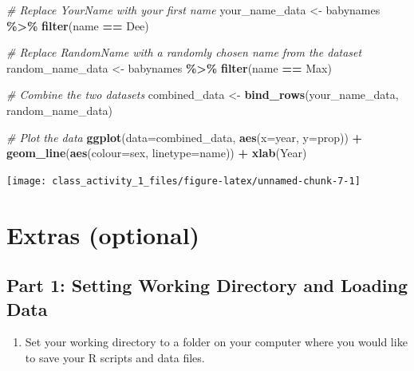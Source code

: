 \documentclass[
]{book}
\newenvironment{Shaded}{\begin{snugshade}}{\end{snugshade}}
\newcommand{\AttributeTok}[1]{\textcolor[rgb]{0.13,0.29,0.53}{#1}}
\newcommand{\CommentTok}[1]{\textcolor[rgb]{0.56,0.35,0.01}{\textit{#1}}}
\newcommand{\FunctionTok}[1]{\textcolor[rgb]{0.13,0.29,0.53}{\textbf{#1}}}
\newcommand{\NormalTok}[1]{#1}
\newcommand{\OtherTok}[1]{\textcolor[rgb]{0.56,0.35,0.01}{#1}}
\newcommand{\SpecialCharTok}[1]{\textcolor[rgb]{0.81,0.36,0.00}{\textbf{#1}}}
\newcommand{\StringTok}[1]{\textcolor[rgb]{0.31,0.60,0.02}{#1}}
\providecommand{\tightlist}{%
  \setlength{\itemsep}{0pt}\setlength{\parskip}{0pt}}
\begin{document}
\begin{Shaded}
\begin{Highlighting}[]
\CommentTok{\# Replace \textquotesingle{}YourName\textquotesingle{} with your first name}
\NormalTok{your\_name\_data }\OtherTok{\textless{}{-}}\NormalTok{ babynames }\SpecialCharTok{\%\textgreater{}\%} \FunctionTok{filter}\NormalTok{(name }\SpecialCharTok{==} \StringTok{\textquotesingle{}Dee\textquotesingle{}}\NormalTok{)}

\CommentTok{\# Replace \textquotesingle{}RandomName\textquotesingle{} with a randomly chosen name from the dataset}
\NormalTok{random\_name\_data }\OtherTok{\textless{}{-}}\NormalTok{ babynames }\SpecialCharTok{\%\textgreater{}\%} \FunctionTok{filter}\NormalTok{(name }\SpecialCharTok{==} \StringTok{\textquotesingle{}Max\textquotesingle{}}\NormalTok{)}

\CommentTok{\# Combine the two datasets}
\NormalTok{combined\_data }\OtherTok{\textless{}{-}} \FunctionTok{bind\_rows}\NormalTok{(your\_name\_data, random\_name\_data)}

\CommentTok{\# Plot the data}
\FunctionTok{ggplot}\NormalTok{(}\AttributeTok{data=}\NormalTok{combined\_data, }\FunctionTok{aes}\NormalTok{(}\AttributeTok{x=}\NormalTok{year, }\AttributeTok{y=}\NormalTok{prop)) }\SpecialCharTok{+} 
  \FunctionTok{geom\_line}\NormalTok{(}\FunctionTok{aes}\NormalTok{(}\AttributeTok{colour=}\NormalTok{sex, }\AttributeTok{linetype=}\NormalTok{name)) }\SpecialCharTok{+} 
  \FunctionTok{xlab}\NormalTok{(}\StringTok{\textquotesingle{}Year\textquotesingle{}}\NormalTok{) }
\end{Highlighting}
\end{Shaded}

\texttt{[image: class\_activity\_1\_files/figure-latex/unnamed-chunk-7-1]}

\hypertarget{extras-optional}{%
\section{Extras (optional)}\label{extras-optional}}

\hypertarget{part-1-setting-working-directory-and-loading-data}{%
\subsection{Part 1: Setting Working Directory and Loading Data}\label{part-1-setting-working-directory-and-loading-data}}

\begin{enumerate}
\def\labelenumi{\arabic{enumi}.}
\tightlist
\item
  Set your working directory to a folder on your computer where you would like to save your R scripts and data files.
\end{enumerate}
\end{document}
